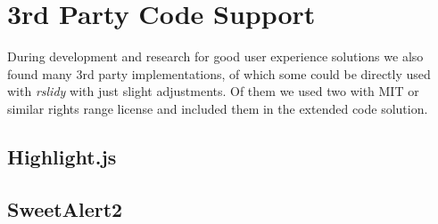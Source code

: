 %
%
% 
% 
% 


\chapter{3rd Party Code Support}

\label{chap:3rdParty}

During development and research for good user experience solutions we also found many 3rd party implementations, of which some could be directly used with \textit{rslidy} with just slight adjustments. Of them we used two with MIT or similar rights range license and included them in the extended code solution.

\section{Highlight.js}

\section{SweetAlert2}
